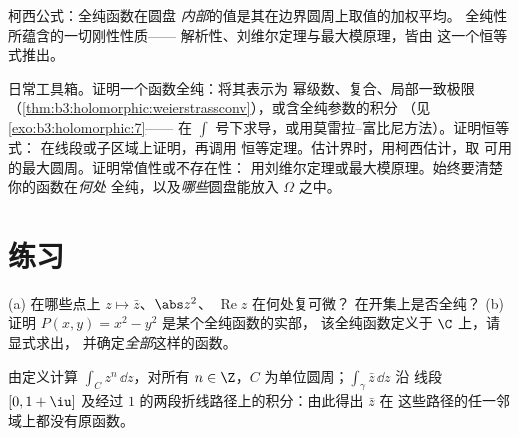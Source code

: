 \begin{omfigure}

{\small 柯西公式：全纯函数在圆盘
\emph{内部}的值是其在边界圆周上取值的加权平均。
全纯性所蕴含的一切刚性性质——
解析性、刘维尔定理与最大模原理，皆由
这一个恒等式推出。}
\end{omfigure}

\begin{method}\label{met:b3:holomorphic:toolkit}
日常工具箱。证明一个函数全纯：将其表示为
幂级数、复合、局部一致极限
（\cref{thm:b3:holomorphic:weierstrassconv}），或含全纯参数的积分
（见\cref{exo:b3:holomorphic:7}——
在 $\int$ 号下求导，或用莫雷拉–富比尼方法）。证明恒等式：
在线段或子区域上证明，再调用
恒等定理。估计界时，用柯西估计，取
可用的最大圆周。证明常值性或不存在性：
用刘维尔定理或最大模原理。始终要清楚你的函数在\emph{何处}
全纯，以及\emph{哪些}圆盘能放入
$\Omega$ 之中。
\end{method}

\section{练习}

\begin{exercise}[$\star$]\label{exo:b3:holomorphic:1}
(a) 在哪些点上 $z \mapsto \bar z$、$\abs z^2$、
$\operatorname{Re}z$ 在何处复可微？
在开集上是否全纯？
(b) 证明 $P(x, y) = x^2 - y^2$ 是某个全纯函数的实部，
该全纯函数定义于 $\C$ 上，请显式求出，
并确定\emph{全部}这样的函数。
\end{exercise}

\begin{exercise}[$\star$]\label{exo:b3:holomorphic:2}
由定义计算 $\int_{C}z^n\,\dd z$，对所有 $n
\in \Z$，$C$ 为单位圆周；$\int_\gamma\bar z\,\dd z$ 沿
线段 $[0, 1+\iu]$ 及经过
$1$ 的两段折线路径上的积分：由此得出 $\bar z$ 在
这些路径的任一邻域上都没有原函数。
\end{exercise}


